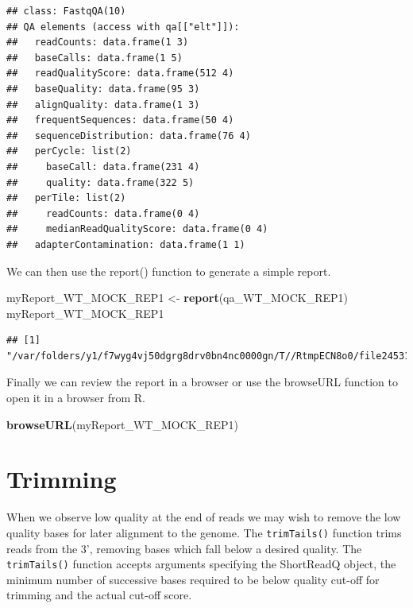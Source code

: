 \documentclass[
]{book}
\newenvironment{Shaded}{\begin{snugshade}}{\end{snugshade}}
\newcommand{\FunctionTok}[1]{\textcolor[rgb]{0.13,0.29,0.53}{\textbf{#1}}}
\newcommand{\NormalTok}[1]{#1}
\newcommand{\OtherTok}[1]{\textcolor[rgb]{0.56,0.35,0.01}{#1}}
\begin{document}
\begin{verbatim}
## class: FastqQA(10)
## QA elements (access with qa[["elt"]]):
##   readCounts: data.frame(1 3)
##   baseCalls: data.frame(1 5)
##   readQualityScore: data.frame(512 4)
##   baseQuality: data.frame(95 3)
##   alignQuality: data.frame(1 3)
##   frequentSequences: data.frame(50 4)
##   sequenceDistribution: data.frame(76 4)
##   perCycle: list(2)
##     baseCall: data.frame(231 4)
##     quality: data.frame(322 5)
##   perTile: list(2)
##     readCounts: data.frame(0 4)
##     medianReadQualityScore: data.frame(0 4)
##   adapterContamination: data.frame(1 1)
\end{verbatim}

We can then use the report() function to generate a simple report.

\begin{Shaded}
\begin{Highlighting}[]
\NormalTok{myReport\_WT\_MOCK\_REP1 }\OtherTok{\textless{}{-}} \FunctionTok{report}\NormalTok{(qa\_WT\_MOCK\_REP1)}
\NormalTok{myReport\_WT\_MOCK\_REP1}
\end{Highlighting}
\end{Shaded}

\begin{verbatim}
## [1] "/var/folders/y1/f7wyg4vj50dgrg8drv0bn4nc0000gn/T//RtmpECN8o0/file245314480129/index.html"
\end{verbatim}

Finally we can review the report in a browser or use the browseURL function to open it in a browser from R.

\begin{Shaded}
\begin{Highlighting}[]
\FunctionTok{browseURL}\NormalTok{(myReport\_WT\_MOCK\_REP1)}
\end{Highlighting}
\end{Shaded}

\hypertarget{trimming}{%
\section{Trimming}\label{trimming}}

When we observe low quality at the end of reads we may wish to remove the low quality bases for later alignment to the genome. The \texttt{trimTails()} function trims reads from the 3', removing bases which fall below a desired quality. The \texttt{trimTails()} function accepts arguments specifying the ShortReadQ object, the minimum number of successive bases required to be below quality cut-off for trimming and the actual cut-off score.
\end{document}

